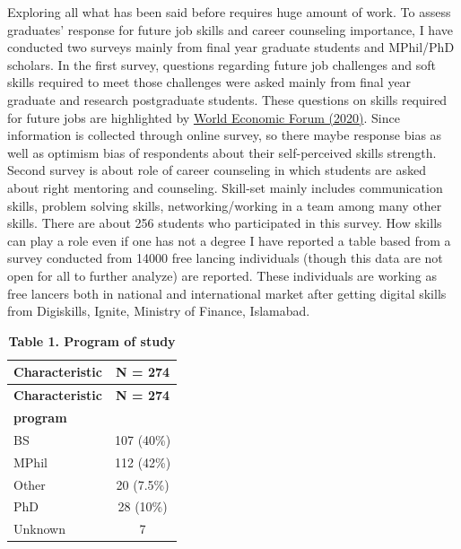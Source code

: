 \documentclass[
  12pt]{article}
\begin{document}
Exploring all what has been said before requires huge amount of work. To
assess graduates' response for future job skills and career counseling
importance, I have conducted two surveys mainly from final year graduate
students and MPhil/PhD scholars. In the first survey, questions
regarding future job challenges and soft skills required to meet those
challenges were asked mainly from final year graduate and research
postgraduate students. These questions on skills required for future
jobs are highlighted by
\href{https://www.weforum.org/events/the-jobs-reset-summit-2020}{World
Economic Forum (2020)}. Since information is collected through online
survey, so there maybe response bias as well as optimism bias of
respondents about their self-perceived skills strength. Second survey is
about role of career counseling in which students are asked about right
mentoring and counseling. Skill-set mainly includes communication
skills, problem solving skills, networking/working in a team among many
other skills. There are about 256 students who participated in this
survey. How skills can play a role even if one has not a degree I have
reported a table based from a survey conducted from 14000 free lancing
individuals (though this data are not open for all to further analyze)
are reported. These individuals are working as free lancers both in
national and international market after getting digital skills from
Digiskills, Ignite, Ministry of Finance, Islamabad.

\begin{longtable}[]{@{}lc@{}}
\caption{\textbf{Table 1. Program of study}}\tabularnewline
\toprule()
\textbf{Characteristic} & \textbf{N = 274} \\
\midrule()
\endfirsthead
\toprule()
\textbf{Characteristic} & \textbf{N = 274} \\
\midrule()
\endhead
\textbf{program} & \\
BS & 107 (40\%) \\
MPhil & 112 (42\%) \\
Other & 20 (7.5\%) \\
PhD & 28 (10\%) \\
Unknown & 7 \\
\bottomrule()
\end{longtable}
\end{document}
